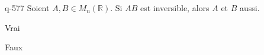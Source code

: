 \begin{truefalse}{q-577}
Soient $A, B \in M_n(\mathbb R)$. Si $AB$ est inversible, alors $A$ et $B$ aussi.
\item* Vrai
\item Faux
\end{truefalse}

